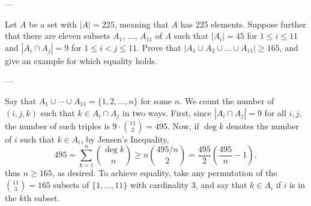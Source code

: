 
---

Let $A$ be a set with $|A|=225$, meaning that $A$ has 225 elements. Suppose further that there are eleven subsets $A_1$, $\ldots$, $A_{11}$ of $A$ such that $|A_i|=45$ for $1\le i\le11$ and $|A_i\cap A_j|=9$ for $1\le i<j\le11$. Prove that $|A_1\cup A_2\cup\ldots\cup A_{11}|\ge165$, and give an example for which equality holds.

---

Say that $A_1\cup\cdots\cup A_{11}=\{1,2,\ldots,n\}$ for some $n$. We count the number of $(i,j,k)$ such that $k\in A_i\cap A_j$ in two ways. First, since $|A_i\cap A_j|=9$ for all $i,j$, the number of such triples is $9\cdot\binom{11}2=495$. Now, if $\deg k$ denotes the number of $i$ such that $k\in A_i$, by Jensen's Inequality, \[495=\sum_{k=1}^n\binom{\deg k}n\ge n\binom{495/n}2=\frac{495}2\left(\frac{495}n-1\right),\]
thus $n\ge165$, as desired. To achieve equality, take any permutation of the $\binom{11}3=165$ subsets of $\{1,\ldots,11\}$ with cardinality $3$, and say that $k\in A_i$ if $i$ is in the $k$th subset.

